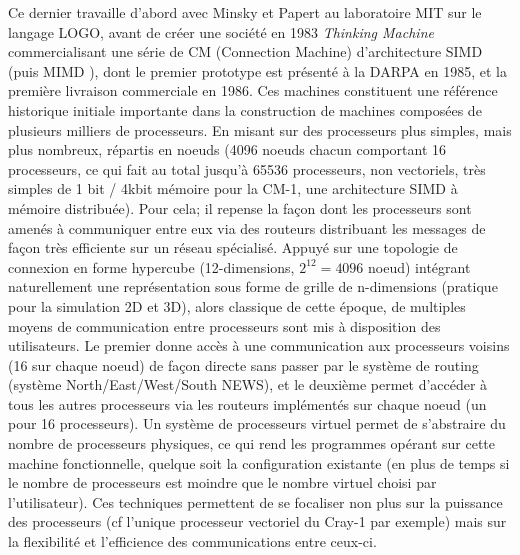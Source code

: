 Ce dernier travaille d'abord avec Minsky et Papert au laboratoire MIT sur le langage LOGO, avant de créer une société en 1983 \textit{Thinking Machine} commercialisant une série de CM (Connection Machine) d’architecture SIMD (puis MIMD ), dont le premier prototype est présenté à la DARPA en 1985, et la première livraison commerciale en 1986. Ces machines constituent une référence historique initiale importante dans la construction de machines composées de plusieurs milliers de processeurs. En misant sur des processeurs plus simples, mais plus nombreux, répartis en noeuds (4096 noeuds chacun comportant 16 processeurs, ce qui fait au total jusqu'à 65536 processeurs, non vectoriels, très simples de 1 bit / 4kbit mémoire pour la CM-1, une architecture SIMD à mémoire distribuée). Pour cela; il repense la façon dont les processeurs sont amenés à communiquer entre eux via des routeurs distribuant les messages de façon très efficiente sur un réseau spécialisé. Appuyé sur une topologie de connexion en forme hypercube (12-dimensions, $2^{12} = 4096$ noeud) intégrant naturellement une représentation sous forme de grille de n-dimensions (pratique pour la simulation 2D et 3D), alors classique de cette époque, de multiples moyens de communication entre processeurs sont mis à disposition des utilisateurs. Le premier donne accès à une communication aux processeurs voisins (16 sur chaque noeud) de façon directe sans passer par le système de routing (système North/East/West/South NEWS), et le deuxième permet d'accéder à tous les autres processeurs via les routeurs implémentés sur chaque noeud (un pour 16 processeurs). Un système de processeurs virtuel permet de s'abstraire du nombre de processeurs physiques, ce qui rend les programmes opérant sur cette machine fonctionnelle, quelque soit la configuration existante (en plus de temps si le nombre de processeurs est moindre que le nombre virtuel choisi par l'utilisateur). Ces techniques permettent de se focaliser non plus sur la puissance des processeurs (cf l'unique processeur vectoriel du Cray-1 par exemple) mais sur la flexibilité et l'efficience des communications entre ceux-ci.


